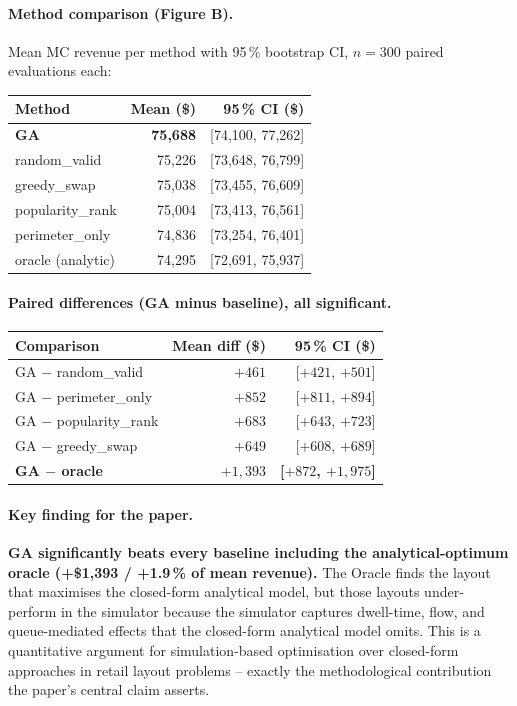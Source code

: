\documentclass[11pt]{article}
\begin{document}
\paragraph{Method comparison (Figure B).}
Mean MC revenue per method with 95\,\% bootstrap CI, $n=300$ paired
evaluations each:

\begin{center}
\begin{tabular}{lrr}
\hline
Method                & Mean (\$) & 95\,\% CI (\$) \\
\hline
\textbf{GA}           & \textbf{75{,}688} & [74{,}100, 77{,}262] \\
random\_valid         & 75{,}226 & [73{,}648, 76{,}799] \\
greedy\_swap          & 75{,}038 & [73{,}455, 76{,}609] \\
popularity\_rank      & 75{,}004 & [73{,}413, 76{,}561] \\
perimeter\_only       & 74{,}836 & [73{,}254, 76{,}401] \\
oracle (analytic)     & 74{,}295 & [72{,}691, 75{,}937] \\
\hline
\end{tabular}
\end{center}

\paragraph{Paired differences (GA minus baseline), all significant.}

\begin{center}
\begin{tabular}{lrr}
\hline
Comparison              & Mean diff (\$) & 95\,\% CI (\$) \\
\hline
GA $-$ random\_valid    & $+461$  & [$+421$, $+501$] \\
GA $-$ perimeter\_only  & $+852$  & [$+811$, $+894$] \\
GA $-$ popularity\_rank & $+683$  & [$+643$, $+723$] \\
GA $-$ greedy\_swap     & $+649$  & [$+608$, $+689$] \\
\textbf{GA $-$ oracle}  & \textbf{$+1{,}393$} & \textbf{[$+872$, $+1{,}975$]} \\
\hline
\end{tabular}
\end{center}

\paragraph{Key finding for the paper.}
\textbf{GA significantly beats every baseline including the
analytical-optimum oracle (+\$1{,}393 / +1.9\,\% of mean revenue).}
The Oracle finds the layout that maximises the closed-form analytical
model, but those layouts under-perform in the simulator because the
simulator captures dwell-time, flow, and queue-mediated effects that
the closed-form analytical model omits. This is a quantitative
argument for simulation-based optimisation over closed-form
approaches in retail layout problems -- exactly the methodological
contribution the paper's central claim asserts.
\end{document}
